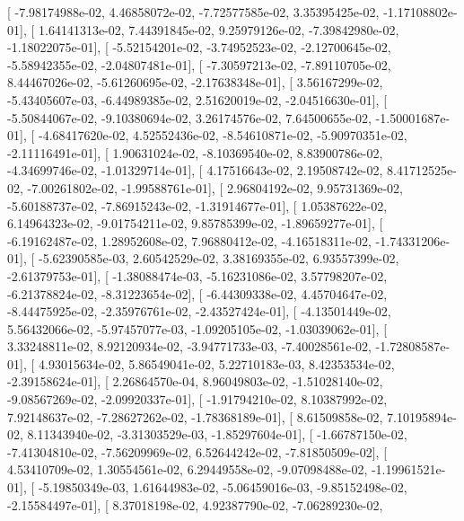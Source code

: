 \documentclass{article}
\begin{document}
       [ -7.98174988e-02,   4.46858072e-02,  -7.72577585e-02,
          3.35395425e-02,  -1.17108802e-01],
       [  1.64141313e-02,   7.44391845e-02,   9.25979126e-02,
         -7.39842980e-02,  -1.18022075e-01],
       [ -5.52154201e-02,  -3.74952523e-02,  -2.12700645e-02,
         -5.58942355e-02,  -2.04807481e-01],
       [ -7.30597213e-02,  -7.89110705e-02,   8.44467026e-02,
         -5.61260695e-02,  -2.17638348e-01],
       [  3.56167299e-02,  -5.43405607e-03,  -6.44989385e-02,
          2.51620019e-02,  -2.04516630e-01],
       [ -5.50844067e-02,  -9.10380694e-02,   3.26174576e-02,
          7.64500655e-02,  -1.50001687e-01],
       [ -4.68417620e-02,   4.52552436e-02,  -8.54610871e-02,
         -5.90970351e-02,  -2.11116491e-01],
       [  1.90631024e-02,  -8.10369540e-02,   8.83900786e-02,
         -4.34699746e-02,  -1.01329714e-01],
       [  4.17516643e-02,   2.19508742e-02,   8.41712525e-02,
         -7.00261802e-02,  -1.99588761e-01],
       [  2.96804192e-02,   9.95731369e-02,  -5.60188737e-02,
         -7.86915243e-02,  -1.31914677e-01],
       [  1.05387622e-02,   6.14964323e-02,  -9.01754211e-02,
          9.85785399e-02,  -1.89659277e-01],
       [ -6.19162487e-02,   1.28952608e-02,   7.96880412e-02,
         -4.16518311e-02,  -1.74331206e-01],
       [ -5.62390585e-03,   2.60542529e-02,   3.38169355e-02,
          6.93557399e-02,  -2.61379753e-01],
       [ -1.38088474e-03,  -5.16231086e-02,   3.57798207e-02,
         -6.21378824e-02,  -8.31223654e-02],
       [ -6.44309338e-02,   4.45704647e-02,  -8.44475925e-02,
         -2.35976761e-02,  -2.43527424e-01],
       [ -4.13501449e-02,   5.56432066e-02,  -5.97457077e-03,
         -1.09205105e-02,  -1.03039062e-01],
       [  3.33248811e-02,   8.92120934e-02,  -3.94771733e-03,
         -7.40028561e-02,  -1.72808587e-01],
       [  4.93015634e-02,   5.86549041e-02,   5.22710183e-03,
          8.42353534e-02,  -2.39158624e-01],
       [  2.26864570e-04,   8.96049803e-02,  -1.51028140e-02,
         -9.08567269e-02,  -2.09920337e-01],
       [ -1.91794210e-02,   8.10387992e-02,   7.92148637e-02,
         -7.28627262e-02,  -1.78368189e-01],
       [  8.61509858e-02,   7.10195894e-02,   8.11343940e-02,
         -3.31303529e-03,  -1.85297604e-01],
       [ -1.66787150e-02,  -7.41304810e-02,  -7.56209969e-02,
          6.52644242e-02,  -7.81850509e-02],
       [  4.53410709e-02,   1.30554561e-02,   6.29449558e-02,
         -9.07098488e-02,  -1.19961521e-01],
       [ -5.19850349e-03,   1.61644983e-02,  -5.06459016e-03,
         -9.85152498e-02,  -2.15584497e-01],
       [  8.37018198e-02,   4.92387790e-02,  -7.06289230e-02,
\end{document}
